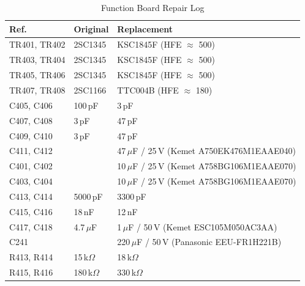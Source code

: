 \documentclass[]{article}
\begin{document}
\begin{table}[H]
	\centering
	\caption{Function Board Repair Log}
	\label{tab:repair_log_function_board}
	\begin{tabular}{|l|l|l|}
		\hline
		\textbf{Ref.} & \textbf{Original} & \textbf{Replacement} \\
		\hline
		TR401, TR402 & 2SC1345 & KSC1845F (HFE $\approx$ 500) \\
		TR403, TR404 & 2SC1345 & KSC1845F (HFE $\approx$ 500) \\
		TR405, TR406 & 2SC1345 & KSC1845F (HFE $\approx$ 500) \\
		TR407, TR408 & 2SC1166 & TTC004B (HFE $\approx$ 180) \\
		\hline
		C405, C406 & 100\,pF & 3\,pF \\
		C407, C408 & 3\,pF & 47\,pF \\
		C409, C410 & 3\,pF & 47\,pF \\
		C411, C412 &   & 47\,$\mu$F / 25\,V (Kemet A750EK476M1EAAE040) \\
		C401, C402 &   & 10\,$\mu$F / 25\,V (Kemet A758BG106M1EAAE070) \\
		C403, C404 &   & 10\,$\mu$F / 25\,V (Kemet A758BG106M1EAAE070) \\
		C413, C414 & 5000\,pF & 3300\,pF \\
		C415, C416 & 18\,nF & 12\,nF \\
		C417, C418 & 4.7\,$\mu$F & 1\,$\mu$F / 50\,V (Kemet ESC105M050AC3AA) \\
		C241 &   & 220\,$\mu$F / 50\,V (Panasonic EEU-FR1H221B) \\
		\hline
		R413, R414 & 15\,k$\Omega$ & 18\,k$\Omega$ \\
		R415, R416 & 180\,k$\Omega$ & 330\,k$\Omega$ \\
		\hline
	\end{tabular}
\end{table}
\end{document}
